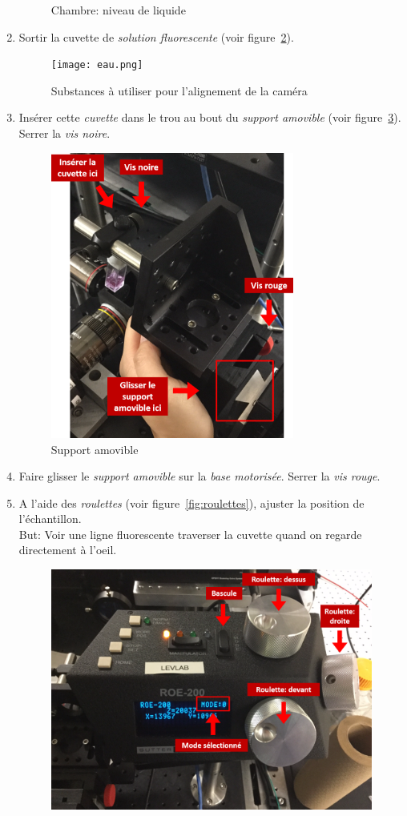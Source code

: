 \begin{enumerate}
\begin{figure}[H]
        \caption{Chambre: niveau de liquide}
        \label{fig:chambre}
        \end{figure}
    \item Sortir la cuvette de \textit{solution fluorescente} (voir figure~\ref{fig:eau}).
       \begin{figure}[H]
        \centering
        \texttt{[image: eau.png]}
        \caption{Substances à utiliser pour l'alignement de la caméra}
        \label{fig:eau}
        \end{figure}
    \item \label{ref1} Insérer cette \textit{cuvette} dans le trou au bout du \textit{support amovible} (voir figure~\ref{fig:suport}). Serrer la \textit{vis noire}.
        \begin{figure}[H]
        \centering
        \includegraphics[width=8cm]{support.png}
        \caption{Support amovible}
        \label{fig:suport}
        \end{figure}
    \item Faire glisser le \textit{support amovible} sur la \textit{base motorisée}. Serrer la \textit{vis rouge}.
    \item  \label{ref2} A l'aide des \textit{roulettes} (voir figure~\ref{fig:roulettes}), ajuster la position de l'échantillon.
    \\ But: Voir une ligne fluorescente traverser la cuvette quand on regarde directement à l'oeil.
        \begin{figure}[H]
        \centering
        \includegraphics[width=12cm]{roulettes.png}

\end{figure}
\end{enumerate}
